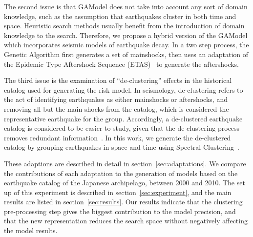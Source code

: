 The second issue is that GAModel does not take into account any sort
of domain knowledge, such as the assumption that earthquakes cluster
in both time and space. Heuristic search methods usually benefit from
the introduction of domain knowledge to the search. Therefore, we
propose a hybrid version of the GAModel which incorporates seismic
models of earthquake decay. In a two step process, the Genetic
Algorithm first generates a set of mainshocks, then uses an adaptation
of the Epidemic Type Aftershock Sequence
(ETAS)~\cite{zhuang2004analyzing} to generate the aftershocks.

The third issue is the examination of ``de-clustering'' effects in the
historical catalog used for generating the risk model. In seismology,
de-clustering refers to the act of identifying earthquakes as either
mainshocks or aftershocks, and removing all but the main shocks from
the catalog, which is considered the representative earthquake for the
group. Accordingly, a de-clustered earthquake catalog is considered to
be easier to study, given that the de-clustering process removes
redundant information~\cite{van2012seismicity}. In this work, we
generate the de-clustered catalog by grouping earthquakes in space and
time using Spectral Clustering~\cite{spectral_tutorial}.

These adaptions are described in detail in
section~\ref{sec:adaptations}. We compare the contributions of each
adaptation to the generation of models based on the earthquake catalog
of the Japanese archipelago, between 2000 and 2010. The set up of this
experiment is described in section~\ref{sec:experiment}, and the main
results are listed in section~\ref{sec:results}.  Our results indicate
that the clustering pre-processing step gives the biggest contribution
to the model precision, and that the new representation reduces the
search space without negatively affecting the model results.

